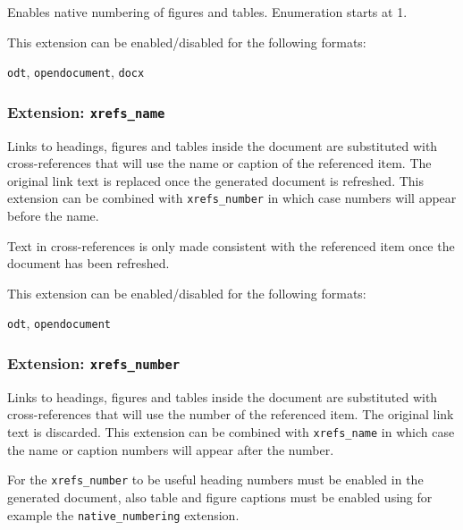 \documentclass[
]{article}
\providecommand{\tightlist}{%
  \setlength{\itemsep}{0pt}\setlength{\parskip}{0pt}}
\begin{document}
Enables native numbering of figures and tables. Enumeration starts at 1.

This extension can be enabled/disabled for the following formats:

\begin{description}
\tightlist
\item[output formats]
\texttt{odt}, \texttt{opendocument}, \texttt{docx}
\end{description}

\hypertarget{extension-xrefs_name}{%
\subsubsection{\texorpdfstring{Extension:
\texttt{xrefs\_name}}{Extension: xrefs\_name}}\label{extension-xrefs_name}}

Links to headings, figures and tables inside the document are
substituted with cross-references that will use the name or caption of
the referenced item. The original link text is replaced once the
generated document is refreshed. This extension can be combined with
\texttt{xrefs\_number} in which case numbers will appear before the
name.

Text in cross-references is only made consistent with the referenced
item once the document has been refreshed.

This extension can be enabled/disabled for the following formats:

\begin{description}
\tightlist
\item[output formats]
\texttt{odt}, \texttt{opendocument}
\end{description}

\hypertarget{extension-xrefs_number}{%
\subsubsection{\texorpdfstring{Extension:
\texttt{xrefs\_number}}{Extension: xrefs\_number}}\label{extension-xrefs_number}}

Links to headings, figures and tables inside the document are
substituted with cross-references that will use the number of the
referenced item. The original link text is discarded. This extension can
be combined with \texttt{xrefs\_name} in which case the name or caption
numbers will appear after the number.

For the \texttt{xrefs\_number} to be useful heading numbers must be
enabled in the generated document, also table and figure captions must
be enabled using for example the \texttt{native\_numbering} extension.
\end{document}
